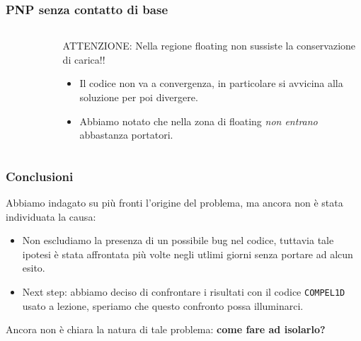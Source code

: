 \begin{frame}
\frametitle{PNP senza contatto di base}
\begin{center}
\begin{columns}
\begin{column}{0.5 \paperwidth}
\begin{figure}
\end{figure}
\end{column}
\begin{column}{0.4 \paperwidth}
\begin{center}
\vspace{-2cm}



\footnotesize

\begin{alertblock}{ \footnotesize ATTENZIONE:}
Nella regione floating non sussiste la conservazione di carica!!
\end{alertblock}

\begin{itemize}
\item Il codice non va a convergenza, in particolare si avvicina alla soluzione per poi divergere.
\item  Abbiamo notato che nella zona di floating  \textit{non entrano} abbastanza portatori.
\end{itemize}

\end{center}
\end{column}
\end{columns}
\end{center}
\end{frame}

\begin{frame}
\frametitle{Conclusioni}
Abbiamo indagato su pi\`u fronti l'origine del problema, ma ancora non \`e stata individuata la causa:
\begin{itemize}
\item Non escludiamo la presenza di un possibile bug nel codice, tuttavia tale ipotesi \`e stata affrontata pi\`u volte negli utlimi giorni senza portare ad alcun esito.
\item Next step: abbiamo deciso di confrontare i risultati con il codice \texttt{COMPEL1D} usato a lezione, speriamo che questo confronto possa illuminarci.
\end{itemize}

Ancora non \`e chiara la natura di tale problema: \textbf{come fare ad isolarlo?} 

\end{frame}
